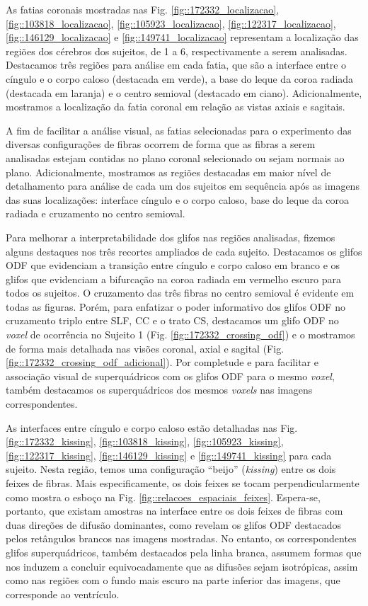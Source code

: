 As fatias coronais mostradas nas Fig.
\ref{fig::172332_localizacao},
\ref{fig::103818_localizacao},
\ref{fig::105923_localizacao},
\ref{fig::122317_localizacao},
\ref{fig::146129_localizacao} e
\ref{fig::149741_localizacao} representam a localização das regiões dos cérebros dos sujeitos, de 1 a 6, respectivamente a serem analisadas. Destacamos três regiões para análise em cada fatia, que são a interface entre o cíngulo e o corpo caloso (destacada em verde), a base do leque da coroa radiada (destacada em laranja) e o centro semioval (destacado em ciano). Adicionalmente, mostramos a localização da fatia coronal em relação as vistas axiais e sagitais.

A fim de facilitar a análise visual, as fatias selecionadas para o experimento das diversas configurações de fibras ocorrem de forma que as fibras a serem analisadas estejam contidas no plano coronal selecionado ou sejam normais ao plano.
Adicionalmente, mostramos as regiões destacadas em maior nível de detalhamento para análise de cada um dos sujeitos em sequência após as imagens das suas localizações: interface cíngulo e o corpo caloso, base do leque da coroa radiada e cruzamento no centro semioval.

Para melhorar a interpretabilidade dos glifos nas regiões analisadas, fizemos alguns destaques nos três recortes ampliados de cada sujeito. Destacamos os glifos ODF que evidenciam a transição entre cíngulo e corpo caloso em branco e os glifos que evidenciam a bifurcação na coroa radiada em vermelho escuro para todos os sujeitos. O cruzamento das três fibras no centro semioval é evidente em todas as figuras. Porém, para enfatizar o poder informativo dos glifos ODF no cruzamento triplo entre SLF, CC e o trato CS, destacamos um glifo ODF no \textit{voxel} de ocorrência no Sujeito 1 (Fig. \ref{fig::172332_crossing_odf}) e o mostramos de forma mais detalhada nas visões coronal, axial e sagital (Fig. \ref{fig::172332_crossing_odf_adicional}). Por completude e para facilitar e associação visual de superquádricos com os glifos ODF para o mesmo \textit{voxel}, também destacamos os superquádricos dos mesmos \textit{voxels} nas imagens correspondentes.

As interfaces entre cíngulo e corpo caloso estão detalhadas nas Fig. \ref{fig::172332_kissing},
\ref{fig::103818_kissing},
\ref{fig::105923_kissing},
\ref{fig::122317_kissing},
\ref{fig::146129_kissing} e
\ref{fig::149741_kissing} para cada sujeito. Nesta região, temos uma configuração ``beijo'' (\textit{kissing}) entre os dois feixes de fibras. Mais especificamente, os dois feixes se tocam perpendicularmente como mostra o esboço na Fig. \ref{fig::relacoes_espaciais_feixes}. Espera-se, portanto, que existam amostras na interface entre os dois feixes de fibras com duas direções de difusão dominantes, como revelam os glifos ODF destacados pelos retângulos brancos nas imagens mostradas. No entanto, os correspondentes glifos superquádricos, também destacados pela linha branca, assumem formas que nos induzem a concluir equivocadamente que as difusões sejam isotrópicas, assim como nas regiões com o fundo mais escuro na parte inferior das imagens, que corresponde ao ventrículo.

